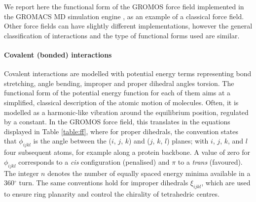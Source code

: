 We report here the functional form of the GROMOS force field \citep{Oostenbrink2004,Schmid2011,Reif2012} implemented in the GROMACS MD simulation engine \citep{Berendsen1995,Abraham2015,gromacs_man}, as an example of a classical force field.
%
Other force fields can have slightly different implementations, however the general classification of interactions and the type of functional forms used are similar.

\paragraph{Covalent (bonded) interactions} Covalent interactions are modelled with potential energy terms representing bond stretching, angle bending, improper and proper dihedral angles torsion. 
%
The functional form of the potential energy function for each of them aims at a simplified, classical description of the atomic motion of molecules. Often, it is modelled as a harmonic-like vibration around the equilibrium position, regulated by a constant.
%
In the GROMOS force field, this translates in the equations displayed in Table \ref{table:ff}, where for proper dihedrals, the convention states that $\phi_{ijkl}$ is the angle between the ($i$, $j$, $k$) and ($j$, $k$, $l$) planes; with $i$, $j$, $k$, and $l$ four subsequent atoms, for example along a protein backbone. A value of zero for $\phi_{ijkl}$ corresponds to a \textit{cis} configuration (penalised) and $\pi$ to a \emph{trans} (favoured). The integer $n$ denotes the number of equally spaced energy minima available in a 360$^\circ$ turn.
%
The same conventions hold for improper dihedrals $\xi_{ijkl}$, which are used to ensure ring planarity and control the chirality of tetrahedric centres.

